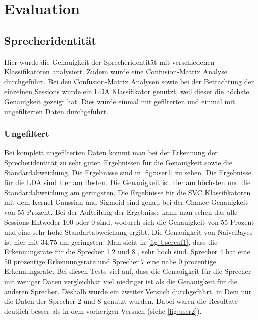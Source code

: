 \chapter{Evaluation}
\section{Sprecheridentität}
Hier wurde die Genauigkeit der Sprecheridentität mit verschiedenen Klassifikatoren  analysiert. Zudem wurde eine Confusion-Matrix Analyse durchgeführt.
Bei den Confusion-Matrix Analysen sowie bei der Betrachtung der einzelnen Sessions wurde ein LDA Klassifikator genutzt, weil dieser die höchste Genauigkeit gezeigt hat. Dies wurde einmal mit gefilterten und einmal mit ungefilterten Daten durchgeführt.
\subsection{Ungefiltert}
Bei komplett ungefilterten Daten kommt man bei der Erkennung der Sprecheridentität zu sehr guten Ergebnissen für die Genauigkeit sowie die Standardabweichung. Die Ergebnisse sind in \ref{fig:user1} zu sehen. Die Ergebnisse für die LDA sind hier am Besten. Die Genauigkeit ist hier am höchsten und die Standardabweichung am geringsten. 
Die Ergebnisse für die SVC Klassifikatoren mit dem Kernel Gaussian und Sigmoid sind genau bei der Chance Genauigkeit von 55 Prozent. Bei der Aufteilung der Ergebnisse kann man sehen das alle Sessions Entweder 100 oder 0 sind, wodurch sich die Genauigkeit von 55 Prozent und eine sehr hohe Standartabweichung ergibt. Die Genauigkeit von NaiveBayes ist hier mit 34.75 am geringsten. Man sieht in \ref{fig:Usercnf1}, dass die Erkennungsrate für die Sprecher 1,2 und 8 , sehr hoch sind. Sprecher 4 hat eine 50 prozentige Erkennungsrate und Sprecher 7 eine nahe 0 prozentige Erkennungsrate.
Bei diesen Tests viel auf, dass die Genauigkeit für die Sprecher mit weniger Daten vergleichbar viel niedriger ist als die Genauigkeit für die anderen Sprecher. Deshalb wurde ein zweiter Versuch durchgeführt, in Dem nur die Daten der Sprecher 2 und 8 genutzt wurden. Dabei waren die Resultate deutlich besser als in dem vorherigen Versuch (siehe \ref{fig:user2}).

